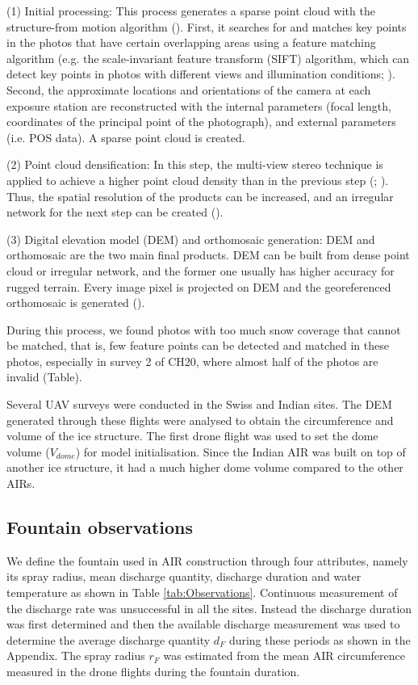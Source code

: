 \documentclass[utf8]{frontiersSCNS} %
\begin{document}
(1) Initial processing: This process generates a sparse point cloud with the structure-from motion algorithm
(\cite{Turner_2012}). First, it searches for and matches key points in the photos that have certain overlapping areas
using a feature matching algorithm (e.g. the scale-invariant feature transform (SIFT) algorithm, which can detect key
points in photos with different views and illumination conditions; \cite{Lowe_2004}). Second, the approximate locations
and orientations of the camera at each exposure station are reconstructed with the internal parameters (focal length,
coordinates of the principal point of the photograph), and external parameters (i.e. POS data). A sparse point cloud is
created.

(2) Point cloud densification: In this step, the multi-view stereo technique is applied to achieve a higher point cloud
density than in the previous step (\cite{Furukawa_2010}; \cite{Molg_2017}). Thus, the spatial resolution of the products
can be increased, and an irregular network for the next step can be created (\cite{Kung_2011}).

(3) Digital elevation model (DEM) and orthomosaic generation: DEM and orthomosaic are the two main final products. DEM
can be built from dense point cloud or irregular network, and the former one usually has higher accuracy for rugged
terrain. Every image pixel is projected on DEM and the georeferenced orthomosaic is generated (\cite{Kung_2011}).

During this process, we found photos with too much snow coverage that cannot be matched, that is, few feature points can
be detected and matched in these photos, especially in survey 2 of CH20, where almost half of the photos are invalid
(Table).

Several UAV surveys were conducted in the Swiss and Indian sites. The DEM generated through these flights were analysed
to obtain the circumference and volume of the ice structure. The first drone flight was used to set the dome volume
($V_{dome}$) for model initialisation. Since the Indian AIR was built on top of another ice structure, it had a much
higher dome volume compared to the other AIRs.

\subsection{Fountain observations}
We define the fountain used in AIR construction through four attributes, namely its spray radius, mean discharge
quantity, discharge duration and water temperature as shown in Table \ref{tab:Observations}. Continuous measurement of
the discharge rate was unsuccessful in all the sites. Instead the discharge duration was first determined and then the
available discharge measurement was used to determine the average discharge quantity $d_F$ during these periods as shown
in the Appendix. The spray radius $r_F$ was estimated from the mean AIR circumference measured in the drone flights
during the fountain duration.
\end{document}
